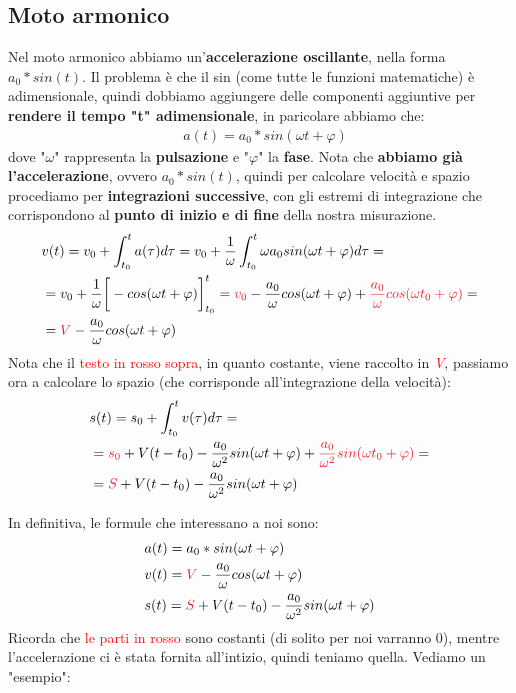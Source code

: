 		\subsection{Moto armonico} \label{Moto armonico}
			Nel moto armonico abbiamo un'\textbf{accelerazione oscillante}, nella forma \underline{$a_0*sin(t)$}. Il problema è che il sin (come tutte le funzioni matematiche) è adimensionale, quindi dobbiamo aggiungere delle componenti aggiuntive per \textbf{rendere il tempo "t" adimensionale}, in paricolare abbiamo che:
			\begin{align*}
				&a(t) = a_0 * sin(\omega t + \varphi)
			\end{align*}
			dove "$\omega$" rappresenta la \textbf{pulsazione} e "$\varphi$" la \textbf{fase}. Nota che \textbf{abbiamo già l'accelerazione}, ovvero $a_0*sin(t)$, quindi per calcolare velocità e spazio procediamo per \textbf{integrazioni successive}, con gli estremi di integrazione che corrispondono al \textbf{punto di inizio e di fine} della nostra misurazione.
			\begin{align*}
				&v(t)= v_0 +\int_{t_0}^ta(\tau) d\tau = v_0 + \frac{1}{\omega} \int_{t_0}^t \omega a_0 sin(\omega t+\varphi)d\tau=\\
				&=v_0 + \frac{1}{\omega} \bigg[-cos(\omega t+\varphi)\bigg]_{t_0}^t=\textcolor{Red}{v_0} - \frac{a_0}{\omega} cos(\omega t+\varphi) + \textcolor{Red}{\frac{a_0}{\omega} cos(\omega t_0+\varphi)}=\\
				&=\textcolor{Red}{V}-\frac{a_0}{\omega} cos(\omega t+\varphi)
			\end{align*}
			Nota che il \textcolor{Red}{testo in rosso sopra}, in quanto costante, viene raccolto in \textit{\textcolor{Red}{V}}, passiamo ora a calcolare lo spazio (che corrisponde all'integrazione della velocità):
			\begin{align*}
				&s(t)= s_0 +\int_{t_0}^tv(\tau) d\tau =\\
				&=\textcolor{Red}{s_0} + V(t-t_0) - \frac{a_0}{\omega^2} sin(\omega t+\varphi) + \textcolor{Red}{\frac{a_0}{\omega^2} sin(\omega t_0+\varphi)}=\\
				&=\textcolor{Red}{S} + V(t-t_0) -\frac{a_0}{\omega^2} sin(\omega t+\varphi)
			\end{align*}

			In definitiva, le formule che interessano a noi sono:
			\begin{align*}
				&a(t)=a_0 * sin(\omega t + \varphi)\\
				&v(t)=\textcolor{Red}{V}-\frac{a_0}{\omega} cos(\omega t+\varphi)\\
				&s(t)=\textcolor{Red}{S} + V(t-t_0) -\frac{a_0}{\omega^2} sin(\omega t+\varphi)\\
			\end{align*}
			Ricorda che \textcolor{Red}{le parti in rosso} sono costanti (di solito per noi varranno 0), mentre l'accelerazione ci è stata fornita all'intizio, quindi teniamo quella. Vediamo un "esempio":

